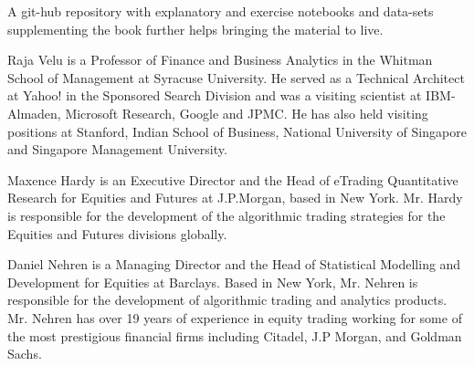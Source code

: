 \noindent A git-hub repository with explanatory and exercise notebooks and data-sets supplementing the book further helps bringing the material to live. \twomedskip


\noindent Raja Velu is a Professor of Finance and Business Analytics in the Whitman School of Management at Syracuse University. He served as a Technical Architect at Yahoo! in the Sponsored Search Division and was a visiting scientist at IBM-Almaden, Microsoft Research, Google and JPMC. He has also held visiting positions at Stanford, Indian School of Business, National University of Singapore and Singapore Management University. \medskip

\noindent Maxence Hardy is an Executive Director and the Head of eTrading Quantitative Research for Equities and Futures at J.P.Morgan, based in New York. Mr. Hardy is responsible for the development of the algorithmic trading strategies for the Equities and Futures divisions globally. \medskip

\noindent Daniel Nehren is a Managing Director and the Head of Statistical Modelling and Development for Equities at Barclays. Based in New York, Mr. Nehren is responsible for the development of algorithmic trading and analytics products. Mr. Nehren has over 19 years of experience in equity trading working for some of the most prestigious financial firms including Citadel, J.P Morgan, and Goldman Sachs. 